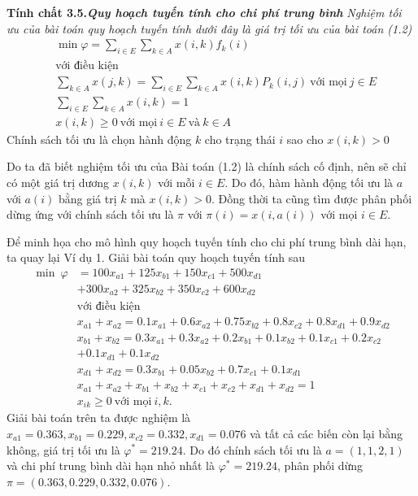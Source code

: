 \documentclass[12pt,a4paper]{report}
\begin{document}
\medskip
{}
\begin{shaded*}
	\noindent
	\textbf{Tính chất 3.5.\textit{Quy hoạch tuyến tính cho chi phí trung bình}} \textit {Nghiệm tối ưu của bài toán quy hoạch tuyến tính dưới đây là giá trị tối ưu của bài toán (1.2)
\begin{align*}
&\min \varphi =\sum_{i \in E} \sum_{k \in A}x(i,k)f_k(i)\\
&\text{với điều kiện}\\
&\sum_{k \in A}x(j,k)=\sum_{i \in E}\sum_{k \in A}x(i,k)P_k(i,j) \ \text{với mọi} \ j \in E\\
&\sum_{i \in E}\sum_{k \in A}x(i,k)=1\\
&x(i,k) \geq 0 \ \text{với mọi} \ i\in E \ \text{và} \ k\in A
\end{align*}
}
Chính sách tối ưu là chọn hành động $k$ cho trạng thái $i$ sao cho $x(i,k)>0$
\end{shaded*}

\medskip
Do ta đã biết nghiệm tối ưu của Bài toán (1.2) là chính sách cố định, nên sẽ chỉ có một giá trị dương $x(i,k)$ với mỗi $i \in E$. Do đó, hàm hành động tối ưu là $a$ với $a(i)$ bằng giá trị $k$ mà $x(i,k)>0$. Đồng thời ta cũng tìm được phân phối dừng ứng với chính sách tối ưu là $\pi$ với $\pi(i)=x(i,a(i))$ với mọi $i\in E$. 

\medskip
Để minh họa cho mô hình quy hoạch tuyến tính cho chi phí trung bình dài hạn, ta quay lại Ví dụ 1. Giải bài toán quy hoạch tuyến tính sau
\begin{align*}
\min \  \varphi &=100x_{a1}+125x_{b1}+150x_{c1} +500x_{d1}\\
&+300x_{a2}+325x_{b2}+350x_{c2}+600x_{d2}\\
&\text{với điều kiện}\\
&x_{a1}+x_{a2}=0.1x_{a1}+0.6x_{a2}+0.75x_{b2}+0.8x_{c2}+0.8x_{d1}+0.9x_{d2}\\
&x_{b1}+x_{b2}=0.3x_{a1}+0.3x_{a2}+0.2x_{b1}+0.1x_{b2}+0.1x_{c1}+0.2x_{c2}\\
&+0.1x_{d1}+0.1x_{d2}\\
&x_{d1}+x_{d2}=0.3x_{b1}+0.05x_{b2}+0.7x_{c1}+0.1x_{d1}\\
&x_{a1}+x_{a2}+x_{b1}+x_{b2}+x_{c1}+x_{c2}+x_{d1}+x_{d2}=1\\
&x_{ik} \geq 0 \ \text{với mọi} \ i,k.
\end{align*} 
Giải bài toán trên ta được nghiệm là $x_{a1}=0.363, x_{b1}=0.229, x_{c2}=0.332, x_{d1}=0.076$ và tất cả các biến còn lại bằng không, giá trị tối ưu là $\varphi^*=219.24$. Do đó chính sách tối ưu là $a=(1,1,2,1)$ và chi phí trung bình dài hạn nhỏ nhất là $\varphi^*=219.24$, phân phối dừng $\pi=(0.363, 0.229,0.332, 0.076)$.
\end{document}
